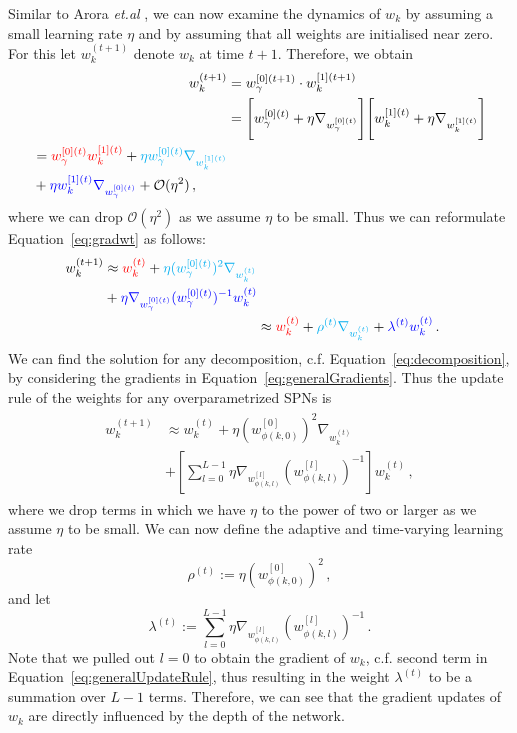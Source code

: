 \documentclass{article}
\newcommand{\wt}{w^{(t)}_{k}}
\newcommand{\wtt}{w^{(t+1)}_{k}}
\newcommand{\wat}{w^{[0](t)}_{\gamma}}
\newcommand{\wbt}{w^{[1](t)}_{k}}
\newcommand{\watt}{w^{[0](t+1)}_{\gamma}}
\newcommand{\wbtt}{w^{[1](t+1)}_{k}}
\begin{document}
Similar to Arora {\it et.al} \cite{Arora2018}, we can now examine the dynamics of $w_k$ by assuming a small learning rate $\eta$ and by assuming that all weights are initialised near zero.
For this let $\wtt$ denote $w_k$ at time $t+1$. Therefore, we obtain
\begin{align} \label{eq:toyUpdateRule}
  \wtt &= \watt \cdot \wbtt \\
  &= \Bigg[ \wat + \eta \nabla_{\wat} \Bigg] \Bigg[ \wbt + \eta \nabla_{\wbt} \Bigg] \\
\begin{split}
  &= \color{red} \wat \wbt \color{black} + \color{cyan} \eta \wat \nabla_{\wbt}  \\
  &+ \color{blue} \eta \wbt \nabla_{\wat} \color{black} + \mathcal{O}(\eta^2) \, ,
\end{split}\label{eq:gradwt}
\end{align}
where we can drop $\mathcal{O}(\eta^2)$ as we assume $\eta$ to be small.
Thus we can reformulate Equation~\ref{eq:gradwt} as follows:
\begin{align}
\begin{split}
  \wtt &\approx \color{red} \wt \color{black} + \color{cyan} \eta (\wat)^{2}\nabla_{\wt} \\
  &+ \color{blue} \eta \nabla_{\wat} (\wat)^{-1} \wt
\end{split} \\
  &\approx \color{red} \wt \color{black} + \color{cyan} \rho^{(t)} \nabla_{\wt} \color{black} + \color{blue} \lambda^{(t)} \wt \,\color{black} .
\end{align}
We can find the solution for any decomposition, c.f. Equation~\ref{eq:decomposition},  by considering the gradients in Equation~\ref{eq:generalGradients}. 
Thus the update rule of the weights for any overparametrized SPNs is
\begin{align}\label{eq:generalUpdateRule}
  \begin{aligned}
  \wtt &\approx \wt + \eta (w^{[0]}_{\phi(k, 0)})^{2}\nabla_{\wt} \\
  &+ \left[ \sum_{l=0}^{L-1} \eta \nabla_{w^{[l]}_{\phi(k, l)}} (w^{[l]}_{\phi(k, l)})^{-1} \right] \wt \, ,
  \end{aligned}
\end{align}
where we drop terms in which we have $\eta$ to the power of two or larger as we assume $\eta$ to be small.
We can now define the adaptive and time-varying learning rate
\[
\rho^{(t)} := \eta (w^{[0]}_{\phi(k, 0)})^{2} \, ,
\]
and let
\[
\lambda^{(t)} := \sum_{l=0}^{L-1} \eta \nabla_{w^{[l]}_{\phi(k, l)}} (w^{[l]}_{\phi(k, l)})^{-1} \, .
\]
Note that we pulled out $l=0$ to obtain the gradient of $w_k$, c.f. second term in Equation~\ref{eq:generalUpdateRule}, thus resulting in the weight $\lambda^{(t)}$ to be a summation over $L-1$ terms.
Therefore, we can see that the gradient updates of $w_k$ are directly influenced by the depth of the network.
\end{document}
